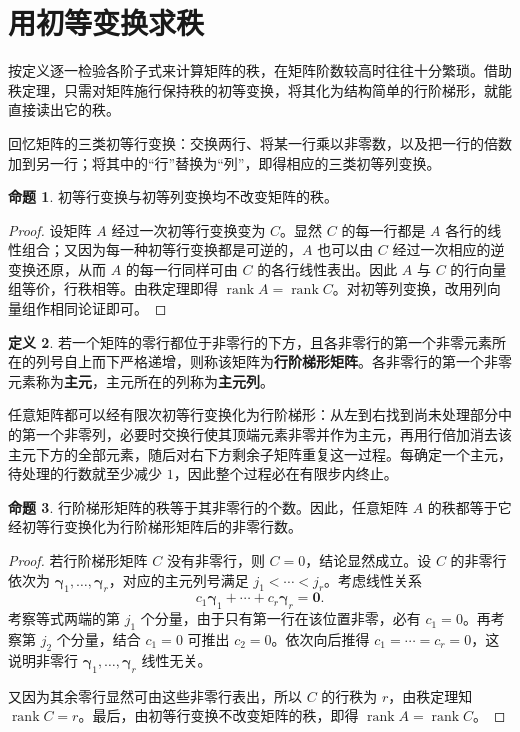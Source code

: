 \documentclass[UTF8, fontset=fandol, a4paper, 12pt]{ctexart}
\newcommand{\rank}{\operatorname{rank}}
\theoremstyle{definition}
\newtheorem{definition}{定义}[section]
\newtheorem{proposition}[definition]{命题}
\begin{document}
\section{用初等变换求秩}

按定义逐一检验各阶子式来计算矩阵的秩，在矩阵阶数较高时往往十分繁琐。借助秩定理，只需对矩阵施行保持秩的初等变换，将其化为结构简单的行阶梯形，就能直接读出它的秩。

回忆矩阵的三类初等行变换：交换两行、将某一行乘以非零数，以及把一行的倍数加到另一行；将其中的“行”替换为“列”，即得相应的三类初等列变换。

\begin{proposition}
初等行变换与初等列变换均不改变矩阵的秩。
\end{proposition}
\begin{proof}
设矩阵 $A$ 经过一次初等行变换变为 $C$。显然 $C$ 的每一行都是 $A$ 各行的线性组合；又因为每一种初等行变换都是可逆的，$A$ 也可以由 $C$ 经过一次相应的逆变换还原，从而 $A$ 的每一行同样可由 $C$ 的各行线性表出。因此 $A$ 与 $C$ 的行向量组等价，行秩相等。由秩定理即得 $\rank A=\rank C$。对初等列变换，改用列向量组作相同论证即可。
\end{proof}

\begin{definition}
若一个矩阵的零行都位于非零行的下方，且各非零行的第一个非零元素所在的列号自上而下严格递增，则称该矩阵为\textbf{行阶梯形矩阵}。各非零行的第一个非零元素称为\textbf{主元}，主元所在的列称为\textbf{主元列}。
\end{definition}

任意矩阵都可以经有限次初等行变换化为行阶梯形：从左到右找到尚未处理部分中的第一个非零列，必要时交换行使其顶端元素非零并作为主元，再用行倍加消去该主元下方的全部元素，随后对右下方剩余子矩阵重复这一过程。每确定一个主元，待处理的行数就至少减少 $1$，因此整个过程必在有限步内终止。

\begin{proposition}
行阶梯形矩阵的秩等于其非零行的个数。因此，任意矩阵 $A$ 的秩都等于它经初等行变换化为行阶梯形矩阵后的非零行数。
\end{proposition}
\begin{proof}
若行阶梯形矩阵 $C$ 没有非零行，则 $C=0$，结论显然成立。设 $C$ 的非零行依次为 $\boldsymbol\gamma_1,\ldots,\boldsymbol\gamma_r$，对应的主元列号满足 $j_1<\cdots<j_r$。考虑线性关系
\[
 c_1\boldsymbol\gamma_1+\cdots+c_r\boldsymbol\gamma_r=\boldsymbol0.
\]
考察等式两端的第 $j_1$ 个分量，由于只有第一行在该位置非零，必有 $c_1=0$。再考察第 $j_2$ 个分量，结合 $c_1=0$ 可推出 $c_2=0$。依次向后推得 $c_1=\cdots=c_r=0$，这说明非零行 $\boldsymbol\gamma_1,\ldots,\boldsymbol\gamma_r$ 线性无关。

又因为其余零行显然可由这些非零行表出，所以 $C$ 的行秩为 $r$，由秩定理知 $\rank C=r$。最后，由初等行变换不改变矩阵的秩，即得 $\rank A=\rank C$。
\end{proof}
\end{document}
